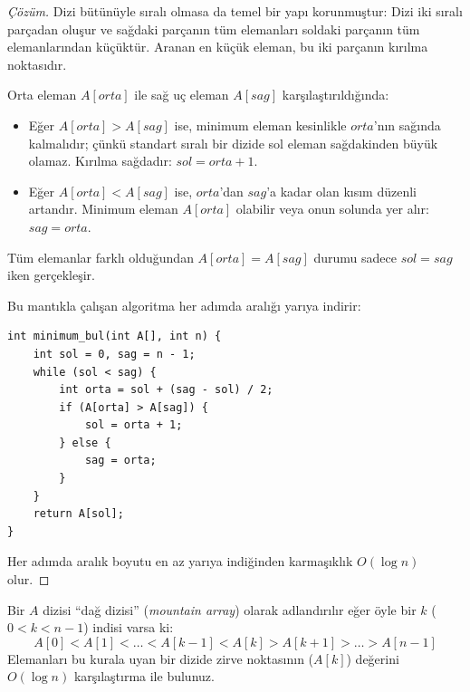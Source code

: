 \begin{proof}[Çözüm]
Dizi bütünüyle sıralı olmasa da temel bir yapı korunmuştur: Dizi iki sıralı parçadan oluşur ve sağdaki parçanın tüm elemanları soldaki parçanın tüm elemanlarından küçüktür. Aranan en küçük eleman, bu iki parçanın kırılma noktasıdır.

Orta eleman $A[orta]$ ile sağ uç eleman $A[sag]$ karşılaştırıldığında:
\begin{itemize}
    \item Eğer $A[orta] > A[sag]$ ise, minimum eleman kesinlikle $orta$'nın sağında kalmalıdır; çünkü standart sıralı bir dizide sol eleman sağdakinden büyük olamaz. Kırılma sağdadır: $sol = orta + 1$.
    \item Eğer $A[orta] < A[sag]$ ise, $orta$'dan $sag$'a kadar olan kısım düzenli artandır. Minimum eleman $A[orta]$ olabilir veya onun solunda yer alır: $sag = orta$.
\end{itemize}
Tüm elemanlar farklı olduğundan $A[orta] = A[sag]$ durumu sadece $sol = sag$ iken gerçekleşir.

Bu mantıkla çalışan algoritma her adımda aralığı yarıya indirir:
\begin{lstlisting}[language=CTemel]
int minimum_bul(int A[], int n) {
    int sol = 0, sag = n - 1;
    while (sol < sag) {
        int orta = sol + (sag - sol) / 2;
        if (A[orta] > A[sag]) {
            sol = orta + 1;
        } else {
            sag = orta;
        }
    }
    return A[sol];
}
\end{lstlisting}
Her adımda aralık boyutu en az yarıya indiğinden karmaşıklık $O(\log n)$ olur.
\end{proof}

\begin{example}
Bir $A$ dizisi ``dağ dizisi'' (\emph{mountain array}) olarak adlandırılır eğer öyle bir $k$ ($0 < k < n-1$) indisi varsa ki:
\[ A[0] < A[1] < \dots < A[k-1] < A[k] > A[k+1] > \dots > A[n-1] \]
Elemanları bu kurala uyan bir dizide zirve noktasının ($A[k]$) değerini $O(\log n)$ karşılaştırma ile bulunuz.
\end{example}

